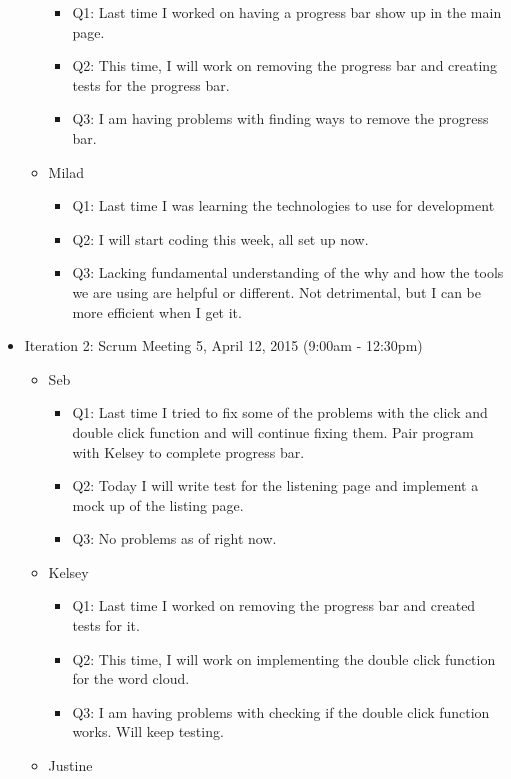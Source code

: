 \documentclass[]{article}
\begin{document}
\begin{itemize}
\begin{itemize}
    \begin{itemize}
    \itemsep1pt\parskip0pt
    \item
      Q1: Last time I worked on having a progress bar show up in the
      main page.
    \item
      Q2: This time, I will work on removing the progress bar and
      creating tests for the progress bar.
    \item
      Q3: I am having problems with finding ways to remove the progress
      bar.
    \end{itemize}
  \item
    Milad

    \begin{itemize}
    \itemsep1pt\parskip0pt
    \item
      Q1: Last time I was learning the technologies to use for
      development
    \item
      Q2: I will start coding this week, all set up now.
    \item
      Q3: Lacking fundamental understanding of the why and how the tools
      we are using are helpful or different. Not detrimental, but I can
      be more efficient when I get it.
    \end{itemize}
  \end{itemize}
\item
  Iteration 2: Scrum Meeting 5, April 12, 2015 (9:00am - 12:30pm)

  \begin{itemize}
  \itemsep1pt\parskip0pt
  \item
    Seb

    \begin{itemize}
    \itemsep1pt\parskip0pt
    \item
      Q1: Last time I tried to fix some of the problems with the click
      and double click function and will continue fixing them. Pair
      program with Kelsey to complete progress bar.
    \item
      Q2: Today I will write test for the listening page and implement a
      mock up of the listing page.
    \item
      Q3: No problems as of right now.
    \end{itemize}
  \item
    Kelsey

    \begin{itemize}
    \itemsep1pt\parskip0pt
    \item
      Q1: Last time I worked on removing the progress bar and created
      tests for it.
    \item
      Q2: This time, I will work on implementing the double click
      function for the word cloud.
    \item
      Q3: I am having problems with checking if the double click
      function works. Will keep testing.
    \end{itemize}
  \item
    Justine


\end{itemize}
\end{itemize}
\end{document}
